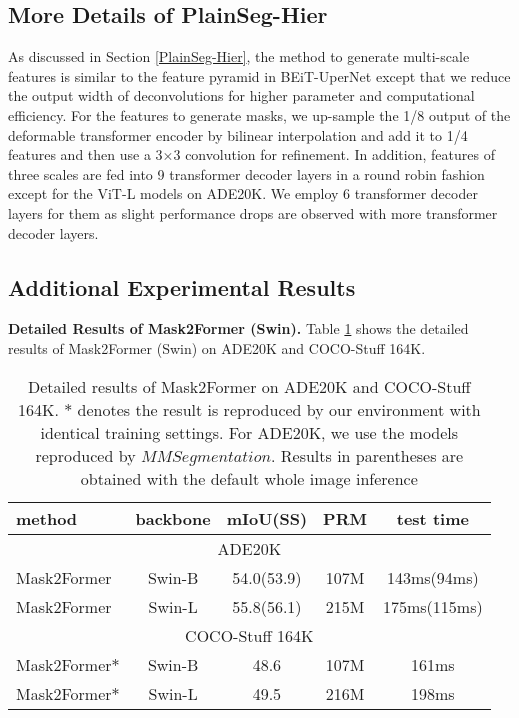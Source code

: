 \documentclass{article} \usepackage{iclr2024_conference,times}
\begin{document}
\subsection{More Details of PlainSeg-Hier}

As discussed in Section \ref{PlainSeg-Hier}, the method to generate multi-scale features is similar to the feature pyramid in BEiT-UperNet \citep{bao2022beit} except that we reduce the output width of deconvolutions for higher parameter and computational efficiency. For the features to generate masks, we up-sample the 1/8 output of the deformable transformer encoder by bilinear interpolation and add it to 1/4 features and then use a 3$\times$3 convolution for refinement. In addition, features of three scales are fed into 9 transformer decoder layers in a round robin fashion except for the ViT-L models on ADE20K. We employ 6 transformer decoder layers for them as slight performance drops are observed with more transformer decoder layers.


\subsection{Additional Experimental Results}

\textbf{Detailed Results of Mask2Former (Swin).} Table \ref{tab:10} shows the detailed results of Mask2Former (Swin) on ADE20K and COCO-Stuff 164K.

\begin{table}[h]
\caption{Detailed results of Mask2Former \citep{cheng2022masked} on ADE20K and COCO-Stuff 164K. $\ast$ denotes the result is reproduced by our environment with identical training settings. For ADE20K, we use the models reproduced by $\mathit{MMSegmentation}$. Results in parentheses are obtained with the default whole image inference}
\begin{center}
\label{tab:10}
\begin{tabular}{l|cccc}
\toprule
method  & backbone   &mIoU(SS)  & PRM  &test time\\\midrule
\multicolumn{5}{c}{ADE20K} \\ \midrule
Mask2Former &Swin-B &54.0(53.9) & 107M & 143ms(94ms)\\
Mask2Former &Swin-L &55.8(56.1) & 215M & 175ms(115ms)\\\midrule
\multicolumn{5}{c}{COCO-Stuff 164K} \\ \midrule
Mask2Former$\ast$ &Swin-B &48.6 & 107M & 161ms\\
Mask2Former$\ast$ &Swin-L &49.5 & 216M & 198ms\\
\bottomrule
\end{tabular}
\end{center}
\end{table}
\end{document}

